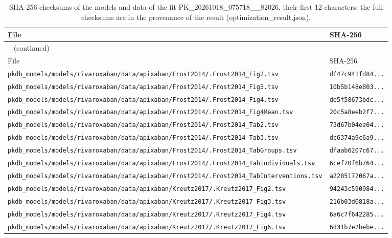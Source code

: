 \documentclass{article}
\begin{document}
\begin{longtable}{ll}
\caption{SHA-256 checksums of the models and data of the fit PK\_20261018\_075718\_\_82026, their first 12 characters; the full checksums are in the provenance of the result (optimization\_result.json).}\label{tab:checksums:PK_20261018_075718__82026} \\
\toprule
File & SHA-256 \\
\midrule
\endfirsthead
\multicolumn{2}{l}{\small\tablename~\thetable{} (continued)} \\
\toprule
File & SHA-256 \\
\midrule
\endhead
\bottomrule
\endlastfoot
\texttt{pkdb\_models/models/rivaroxaban/data/apixaban/Frost2014/.Frost2014\_Fig2.tsv} & \texttt{df47c941fd84...} \\
\texttt{pkdb\_models/models/rivaroxaban/data/apixaban/Frost2014/.Frost2014\_Fig3.tsv} & \texttt{10b5b148e803...} \\
\texttt{pkdb\_models/models/rivaroxaban/data/apixaban/Frost2014/.Frost2014\_Fig4.tsv} & \texttt{de5f58673bdc...} \\
\texttt{pkdb\_models/models/rivaroxaban/data/apixaban/Frost2014/.Frost2014\_Fig4Mean.tsv} & \texttt{20c5a8eeb2f7...} \\
\texttt{pkdb\_models/models/rivaroxaban/data/apixaban/Frost2014/.Frost2014\_Tab2.tsv} & \texttt{73d67b04ee04...} \\
\texttt{pkdb\_models/models/rivaroxaban/data/apixaban/Frost2014/.Frost2014\_Tab3.tsv} & \texttt{dc6374a9c6a9...} \\
\texttt{pkdb\_models/models/rivaroxaban/data/apixaban/Frost2014/.Frost2014\_TabGroups.tsv} & \texttt{dfaab6207c67...} \\
\texttt{pkdb\_models/models/rivaroxaban/data/apixaban/Frost2014/.Frost2014\_TabIndividuals.tsv} & \texttt{6cef70f6b764...} \\
\texttt{pkdb\_models/models/rivaroxaban/data/apixaban/Frost2014/.Frost2014\_TabInterventions.tsv} & \texttt{a2285172067a...} \\
\texttt{pkdb\_models/models/rivaroxaban/data/apixaban/Kreutz2017/.Kreutz2017\_Fig2.tsv} & \texttt{94243c590984...} \\
\texttt{pkdb\_models/models/rivaroxaban/data/apixaban/Kreutz2017/.Kreutz2017\_Fig3.tsv} & \texttt{216b03d0818a...} \\
\texttt{pkdb\_models/models/rivaroxaban/data/apixaban/Kreutz2017/.Kreutz2017\_Fig4.tsv} & \texttt{6a6c7f642285...} \\
\texttt{pkdb\_models/models/rivaroxaban/data/apixaban/Kreutz2017/.Kreutz2017\_Fig6.tsv} & \texttt{6d31b7e2bebe...} \\

\end{longtable}
\end{document}
